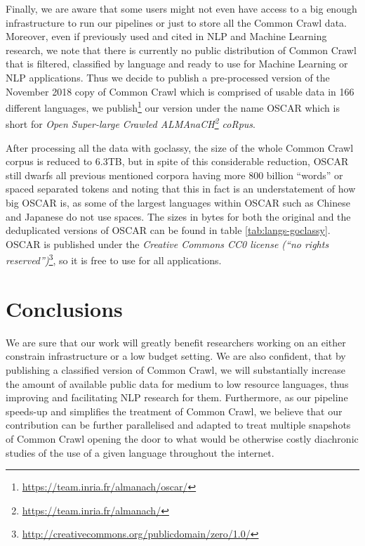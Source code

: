 \begin{table*}[t!]
{\begin{tabular}{@{}lrrrrclrrrr@{}}
            \bottomrule
        \end{tabular}
    }
    \caption{Size of the OSCAR corpus by language measured in bytes and number of words. Standard UNIX human-readable notation is used for the size in byte. We define ``words'' as spaced separated tokens, which gives a good estimate of the size of each corpus for languages using Latin or Cyrillic alphabets, but might give a misleading size for other languages such as Chinese or Japanese.}
    \label{tab:langs-goclassy}
\end{table*}

Finally, we are aware that some users might not even have access to a big enough infrastructure to run our pipelines or just to store all the Common Crawl data. Moreover, even if previously used and cited in NLP and Machine Learning research, we note that there is currently no public distribution of Common Crawl that is filtered, classified by language and ready to use for Machine Learning or NLP applications. Thus we decide to publish a pre-processed version of the November 2018 copy of Common Crawl which is comprised of usable data in 166 different languages, we publish\footnote{\url{https://team.inria.fr/almanach/oscar/}} our version under the name OSCAR which is short for \emph{Open Super-large Crawled ALMAnaCH\footnote{\url{https://team.inria.fr/almanach/}} coRpus}.

After processing all the data with goclassy, the size of the whole Common Crawl corpus is reduced to 6.3TB, but in spite of this considerable reduction, OSCAR still dwarfs all previous mentioned corpora having more 800 billion ``words'' or spaced separated tokens and noting that this in fact is an understatement of how big OSCAR is, as some of the largest languages within OSCAR such as Chinese and Japanese do not use spaces. The sizes in bytes for both the original and the deduplicated versions of OSCAR can be found in table \ref{tab:langs-goclassy}. OSCAR is published under the \emph{Creative Commons CC0 license (``no rights reserved'')}\footnote{\url{http://creativecommons.org/publicdomain/zero/1.0/}}, so it is free to use for all applications.

\section{Conclusions}

We are sure that our work will greatly benefit researchers working on an either constrain infrastructure or a low budget setting. We are also confident, that by publishing a classified version of Common Crawl, we will substantially increase the amount of available public data for medium to low resource languages, thus improving and facilitating NLP research for them. Furthermore, as our pipeline speeds-up and simplifies the treatment of Common Crawl, we believe that our contribution can be further parallelised and adapted to treat multiple snapshots of Common Crawl opening the door to what would be otherwise costly diachronic studies of the use of a given language throughout the internet.

